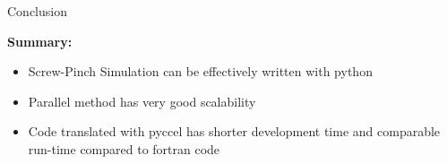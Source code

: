 \documentclass{beamer}
\begin{document}
\begin{frame}{Conclusion}
\begin{overlayarea}{\textwidth}{5cm}
{\bf Summary:}
 \begin{itemize}
  \item Screw-Pinch Simulation can be effectively written with python
  \item Parallel method has very good scalability
  \item Code translated with pyccel has shorter development time and comparable run-time compared to fortran code
 \end{itemize}
 \vspace{1em}
 

\end{overlayarea}
\end{frame}
\end{document}
